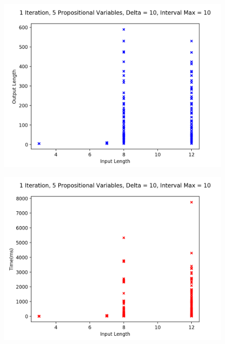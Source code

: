 \documentclass[runningheads]{llncs}
\begin{document}
\begin{minipage}{0.5 \textwidth}
    \begin{figure}[H]
    \centering
    \includegraphics[scale=0.39]{images/Sim4Length.png}
    \end{figure}
\end{minipage}%
\begin{minipage}{0.5 \textwidth}
    \begin{figure}[H]
    \centering
    \includegraphics[scale=0.39]{images/Sim4Time.png}
    \end{figure}
\end{minipage}%
\end{document}
